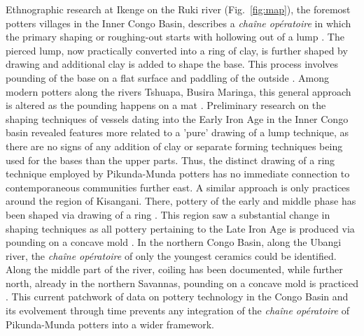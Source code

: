 \documentclass[smallextended,natbib]{svjour3}       %
\begin{document}
Ethnographic research at Ikenge on the Ruki river (Fig.~\ref{fig:map}), the foremost potters villages in the Inner Congo Basin, describes a \textit{chaîne opératoire} in which the primary shaping or roughing-out starts with hollowing out of a lump \citep{Eggert.1980c,KanimbaMisago.1991}. The pierced lump, now practically converted into a ring of clay, is further shaped by drawing and additional clay is added to shape the base. This process involves pounding of the base on a flat surface and paddling of the outside \citep{KanimbaMisago.1991}. Among modern potters along the rivers Tshuapa, Busira Maringa, this general approach is altered as the pounding happens on a mat \citep[188,196--197]{Wotzka.1995}. Preliminary research on the shaping techniques of vessels dating into the Early Iron Age in the Inner Congo basin revealed features more related to a 'pure' drawing of a lump technique, as there are no signs of any addition of clay or separate forming techniques being used for the bases than the upper parts. Thus, the distinct drawing of a ring technique employed by Pikunda-Munda potters has no immediate connection to contemporaneous communities further east. A similar approach is only practices around the region of Kisangani. There, pottery of the early and middle phase has been shaped via drawing of a ring \citep[110,115]{LivingstoneSmith.2017}. This region saw a substantial change in shaping techniques as all pottery pertaining to the Late Iron Age is produced via pounding on a concave mold \citep[111,115]{LivingstoneSmith.2017}. In the northern Congo Basin, along the Ubangi river, the \textit{chaîne opératoire} of only the youngest ceramics could be identified. Along the middle part of the river, coiling has been documented, while further north, already in the northern Savannas, pounding on a concave mold is practiced \citep[55--60 Fig.~19--20,73]{Seidensticker.2021e}. This current patchwork of data on pottery technology in the Congo Basin and its evolvement through time prevents any integration of the \textit{chaîne opératoire} of Pikunda-Munda potters into a wider framework.

\end{document}
